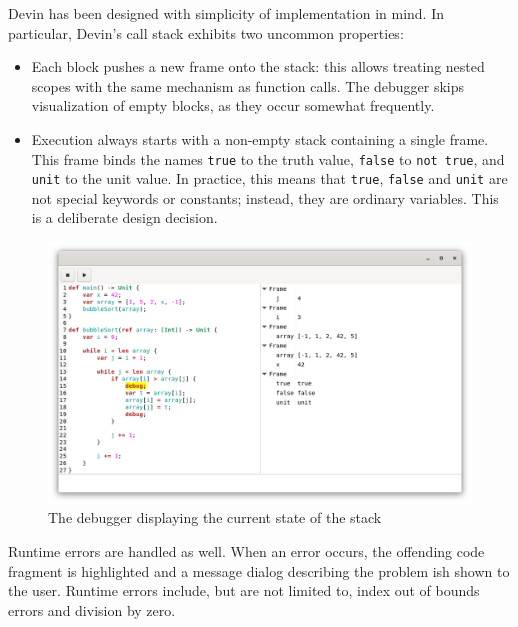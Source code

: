 \documentclass[11pt, american, draft]{PhdThesis}
\begin{document}
  Devin has been designed with simplicity of implementation in mind. In particular, Devin's call
  stack exhibits two uncommon properties:

  \begin{itemize}[noitemsep,topsep=0pt]
    \item Each block pushes a new frame onto the stack: this allows treating nested scopes with the
          same mechanism as function calls. The debugger skips visualization of empty blocks, as
          they occur somewhat frequently.

    \item Execution always starts with a non-empty stack containing a single frame. This frame binds
          the names \verb$true$ to the truth value, \verb$false$ to \verb$not true$, and \verb$unit$
          to the unit value. In practice, this means that \verb$true$, \verb$false$ and \verb$unit$
          are not special keywords or constants; instead, they are ordinary variables. This is a
          deliberate design decision.
  \end{itemize}

  \begin{figure}[H]
    \center
    \includegraphics[width=0.9\linewidth]{5.png}
    \caption{The debugger displaying the current state of the stack}
  \end{figure}

  Runtime errors are handled as well. When an error occurs, the offending code fragment is
  highlighted and a message dialog describing the problem ish shown to the user. Runtime errors
  include, but are not limited to, index out of bounds errors and division by zero.
\end{document}
